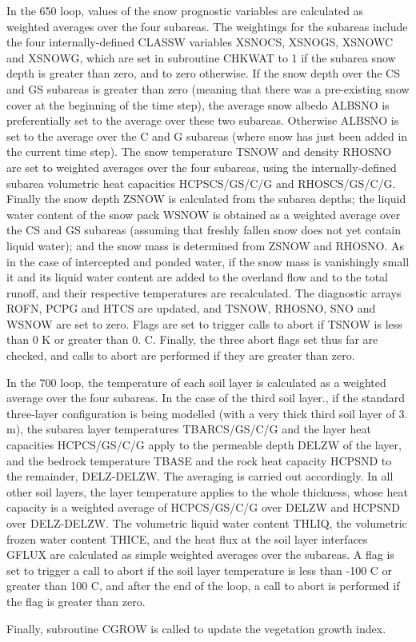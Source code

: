 In the 650 loop, values of the snow prognostic variables are calculated as weighted averages over the four subareas. The weightings for the subareas include the four internally-\/defined C\+L\+A\+S\+S\+W variables X\+S\+N\+O\+C\+S, X\+S\+N\+O\+G\+S, X\+S\+N\+O\+W\+C and X\+S\+N\+O\+W\+G, which are set in subroutine C\+H\+K\+W\+A\+T to 1 if the subarea snow depth is greater than zero, and to zero otherwise. If the snow depth over the C\+S and G\+S subareas is greater than zero (meaning that there was a pre-\/existing snow cover at the beginning of the time step), the average snow albedo A\+L\+B\+S\+N\+O is preferentially set to the average over these two subareas. Otherwise A\+L\+B\+S\+N\+O is set to the average over the C and G subareas (where snow has just been added in the current time step). The snow temperature T\+S\+N\+O\+W and density R\+H\+O\+S\+N\+O are set to weighted averages over the four subareas, using the internally-\/defined subarea volumetric heat capacities H\+C\+P\+S\+C\+S/\+G\+S/\+C/\+G and R\+H\+O\+S\+C\+S/\+G\+S/\+C/\+G. Finally the snow depth Z\+S\+N\+O\+W is calculated from the subarea depths; the liquid water content of the snow pack W\+S\+N\+O\+W is obtained as a weighted average over the C\+S and G\+S subareas (assuming that freshly fallen snow does not yet contain liquid water); and the snow mass is determined from Z\+S\+N\+O\+W and R\+H\+O\+S\+N\+O. As in the case of intercepted and ponded water, if the snow mass is vanishingly small it and its liquid water content are added to the overland flow and to the total runoff, and their respective temperatures are recalculated. The diagnostic arrays R\+O\+F\+N, P\+C\+P\+G and H\+T\+C\+S are updated, and T\+S\+N\+O\+W, R\+H\+O\+S\+N\+O, S\+N\+O and W\+S\+N\+O\+W are set to zero. Flags are set to trigger calls to abort if T\+S\+N\+O\+W is less than 0 K or greater than 0. C. Finally, the three abort flags set thus far are checked, and calls to abort are performed if they are greater than zero.

In the 700 loop, the temperature of each soil layer is calculated as a weighted average over the four subareas. In the case of the third soil layer., if the standard three-\/layer configuration is being modelled (with a very thick third soil layer of 3. m), the subarea layer temperatures T\+B\+A\+R\+C\+S/\+G\+S/\+C/\+G and the layer heat capacities H\+C\+P\+C\+S/\+G\+S/\+C/\+G apply to the permeable depth D\+E\+L\+Z\+W of the layer, and the bedrock temperature T\+B\+A\+S\+E and the rock heat capacity H\+C\+P\+S\+N\+D to the remainder, D\+E\+L\+Z-\/\+D\+E\+L\+Z\+W. The averaging is carried out accordingly. In all other soil layers, the layer temperature applies to the whole thickness, whose heat capacity is a weighted average of H\+C\+P\+C\+S/\+G\+S/\+C/\+G over D\+E\+L\+Z\+W and H\+C\+P\+S\+N\+D over D\+E\+L\+Z-\/\+D\+E\+L\+Z\+W. The volumetric liquid water content T\+H\+L\+I\+Q, the volumetric frozen water content T\+H\+I\+C\+E, and the heat flux at the soil layer interfaces G\+F\+L\+U\+X are calculated as simple weighted averages over the subareas. A flag is set to trigger a call to abort if the soil layer temperature is less than -\/100 C or greater than 100 C, and after the end of the loop, a call to abort is performed if the flag is greater than zero.

Finally, subroutine C\+G\+R\+O\+W is called to update the vegetation growth index.